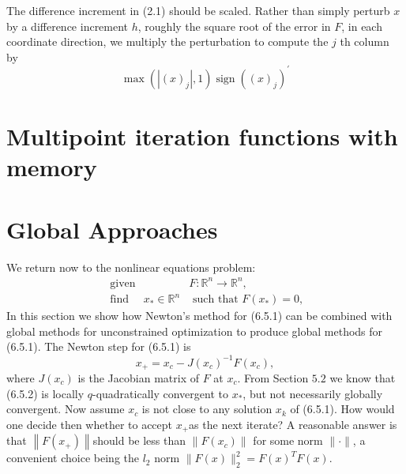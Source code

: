 The difference increment in (2.1) should be scaled. Rather than simply perturb \(x\) by a difference increment \(h\), roughly the square root of the error in \(F\), in each coordinate direction, we multiply the perturbation to compute the \(j\) th column by
\[
\max \left(\left|(x)_{j}\right|, 1\right) \operatorname{sign}\left((x)_{j}\right)^{\prime}
\]

\section{Multipoint iteration functions with memory}

\section{Global Approaches}

We return now to the nonlinear equations problem:
\[
\begin{array}{ll}
\text { given } & F: \mathbb{R}^{n} \longrightarrow \mathbb{R}^{n}, \\
\text { find } \quad x_{*} \in \mathbb{R}^{n} & \text { such that } F\left(x_{*}\right)=0,
\end{array}
\]
In this section we show how Newton's method for (6.5.1) can be combined with global methods for unconstrained optimization to produce global methods for (6.5.1).
The Newton step for (6.5.1) is
\[
x_{+}=x_{c}-J\left(x_{c}\right)^{-1} F\left(x_{c}\right),
\]
where \(J\left(x_{c}\right)\) is the Jacobian matrix of \(F\) at \(x_{c}\). From Section \(5.2\) we know that (6.5.2) is locally \(q\)-quadratically convergent to \(x_{*}\), but not necessarily globally convergent. Now assume \(x_{c}\) is not close to any solution \(x_{k}\) of (6.5.1). How would one decide then whether to accept \(x_{+}\)as the next iterate? A reasonable answer is that \(\left\|F\left(x_{+}\right)\right\|\)should be less than \(\left\|F\left(x_{c}\right)\right\|\) for some norm \(\|\cdot\|\), a convenient choice being the \(l_{2}\) norm \(\|F(x)\|_{2}^{2}=F(x)^{T} F(x)\).

